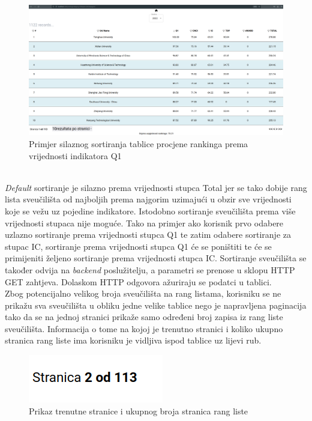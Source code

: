\documentclass[times, utf8, zavrsni]{fer}
\begin{document}
\begin{figure}[htb]
    \hspace*{-2cm}  
       \includegraphics[scale=0.21]{sort2.png} 
       \caption{Primjer silaznog sortiranja tablice procjene rankinga prema vrijednosti indikatora Q1}
       \label{fig:sort2}
       \end{figure}
\\\emph{Default} sortiranje je silazno prema vrijednosti stupca Total jer se tako dobije rang lista sveučilišta od najboljih prema najgorim uzimajući u obzir sve 
vrijednosti koje se vežu uz pojedine indikatore.
Istodobno sortiranje sveučilišta prema više vrijednosti stupaca nije moguće. Tako na primjer ako korisnik prvo odabere uzlazno sortiranje prema vrijednosti stupca 
Q1 te zatim odabere sortiranje za stupac IC, sortiranje prema vrijednosti stupca Q1 će se poništiti te će se primijeniti željeno sortiranje prema vrijednosti stupca IC.
Sortiranje sveučilišta se također odvija na 
\emph{backend} poslužitelju, a parametri se prenose u sklopu HTTP GET zahtjeva. Dolaskom HTTP odgovora ažuriraju se podatci u tablici.
\\Zbog potencijalno velikog broja sveučilišta na rang listama, korisniku se ne prikažu sva sveučilišta u obliku jedne velike tablice nego 
je napravljena paginacija tako da se na jednoj stranici prikaže samo određeni broj zapisa iz rang liste sveučilišta. Informacija o tome na kojoj je trenutno stranici i 
koliko ukupno stranica rang liste ima korisniku je vidljiva ispod tablice uz lijevi rub. 
\begin{figure}[htb]
    \centering
       \includegraphics[scale=0.3]{stranica.png} 
       \caption{Prikaz trenutne stranice i ukupnog broja stranica rang liste}
       \label{fig:paginacija}
       \end{figure}
\end{document}
